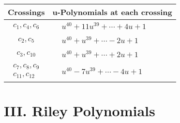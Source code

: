 \documentclass[1p]{elsarticle_modified}
\theoremstyle{definition}
\begin{document}
\begin{tabular}{m{50pt}|m{274pt}}
Crossings & \hspace{64pt}u-Polynomials at each crossing \\
\hline $$\begin{aligned}c_{1},c_{4},c_{6}\end{aligned}$$&$\begin{aligned}
&u^{40}+11 u^{39}+\cdots+4 u+1
\end{aligned}$\\
\hline $$\begin{aligned}c_{2},c_{5}\end{aligned}$$&$\begin{aligned}
&u^{40}+u^{39}+\cdots-2 u+1
\end{aligned}$\\
\hline $$\begin{aligned}c_{3},c_{10}\end{aligned}$$&$\begin{aligned}
&u^{40}+u^{39}+\cdots+2 u+1
\end{aligned}$\\
\hline $$\begin{aligned}c_{7},c_{8},c_{9}\\c_{11},c_{12}\end{aligned}$$&$\begin{aligned}
&u^{40}-7 u^{39}+\cdots-4 u+1
\end{aligned}$\\
\hline
\end{tabular}\newpage\renewcommand{\arraystretch}{1}
\centering \section*{ III. Riley Polynomials}
\end{document}
